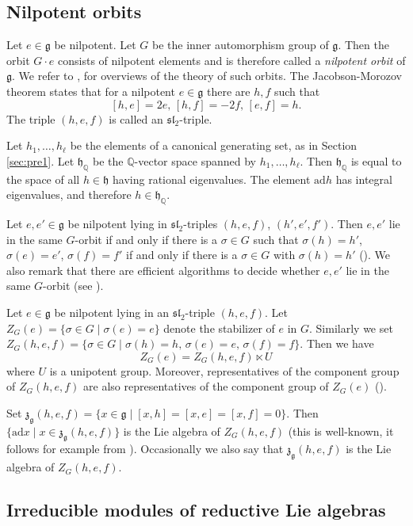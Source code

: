 \documentclass[a4paper,10pt]{amsart}
\newcommand{\Q}{\mathbb{Q}}
\newcommand{\mf}{\mathfrak}
\newcommand{\g}{\mf{g}}
\newcommand{\h}{\mf{h}}
\newcommand{\ssl}{\mf{sl}}
\newcommand{\z}{\mf{z}}
\newcommand{\ad}{\mathrm{ad}}
\numberwithin{equation}{section}
\theoremstyle{remark}
\theoremstyle{remark}
\begin{document}
\subsection{Nilpotent orbits}\label{sec:nilporb}

Let $e\in \g$ be nilpotent. Let $G$ be the inner automorphism group of $\g$.
Then the orbit $G\cdot e$ consists of nilpotent
elements and is therefore called a {\em nilpotent orbit} of $\g$. We refer to
\cite{colmcgov}, \cite{jannilp} for overviews of the theory of such orbits.
The Jacobson-Morozov theorem states that for a nilpotent $e\in \g$ there are
$h,f$ such that
$$[h,e]=2e,\, [h,f]=-2f,\, [e,f]=h.$$
The triple $(h,e,f)$ is called an $\ssl_2$-triple.

Let $h_1,\ldots,h_\ell$ be the elements of a canonical generating set, as in
Section \ref{sec:pre1}. Let $\h_\Q$ be the $\Q$-vector space spanned by
$h_1,\ldots, h_\ell$. Then $\h_\Q$ is equal to the space of all $h\in \h$
having rational eigenvalues. The element $\ad h$
has integral eigenvalues, and therefore $h\in \h_\Q$. 

Let $e,e'\in \g$ be nilpotent lying in $\ssl_2$-triples $(h,e,f)$,
$(h',e',f')$. Then $e,e'$ lie in
the same $G$-orbit if and only if there is a $\sigma\in G$ such that
$\sigma(h)=h'$, $\sigma(e)=e'$, $\sigma(f)=f'$ if and only if
there is a $\sigma\in G$ with $\sigma(h) = h'$ (\cite[Theorem 8.1.4]{gra16}).
We also remark that there are efficient algorithms to decide whether
$e,e'$ lie in the same $G$-orbit (see \cite[\S 8.2]{gra16}). 

Let $e\in \g$ be nilpotent lying in an $\ssl_2$-triple $(h,e,f)$.
Let $Z_G(e) = \{\sigma\in G\mid \sigma(e)=e\}$ denote the stabilizer of
$e$ in $G$. Similarly we set $Z_G(h,e,f) = \{\sigma\in G\mid \sigma(h)=h,\,
\sigma(e)=e,\,\sigma(f)=f\}$. Then we have
$$Z_G(e) = Z_G(h,e,f) \ltimes U$$
where $U$ is a unipotent group. Moreover, representatives of the component
group of $Z_G(h,e,f)$ are also representatives of the component group
of $Z_G(e)$ (\cite[Lemma 3.7.3]{colmcgov}).

Set $\z_\g(h,e,f)=\{x\in\g\mid [x,h]=[x,e]=[x,f]=0\}$. Then $\{\ad x \mid
x\in \z_\g(h,e,f)\}$ is the Lie algebra of $Z_G(h,e,f)$ (this is well-known,
it follows for example from \cite[Corollary 4.2.8]{gra16}). Occasionally we
also say that $\z_\g(h,e,f)$ is the Lie algebra of $Z_G(h,e,f)$. 

\subsection{Irreducible modules of reductive Lie algebras}\label{sec:red}
\end{document}
